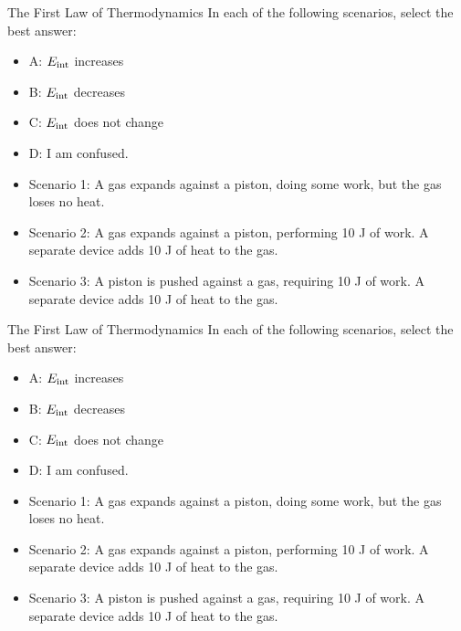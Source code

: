 \documentclass{beamer}
\begin{document}
\begin{frame}{The First Law of Thermodynamics}
In each of the following scenarios, select the best answer:
\small
\begin{itemize}
\item A: $E_{\rm int}$ increases
\item B: $E_{\rm int}$ decreases
\item C: $E_{\rm int}$ does not change
\item D: I am confused.
\end{itemize}
\small
\begin{itemize}
\item Scenario 1: A gas expands against a piston, doing some work, but the gas loses no heat.
\item Scenario 2: \alert{A gas expands against a piston, performing 10 J of work.  A separate device adds 10 J of heat to the gas.}
\item Scenario 3: A piston is pushed against a gas, requiring 10 J of work.  A separate device adds 10 J of heat to the gas.
\end{itemize}
\end{frame}

\begin{frame}{The First Law of Thermodynamics}
In each of the following scenarios, select the best answer:
\small
\begin{itemize}
\item A: $E_{\rm int}$ increases
\item B: $E_{\rm int}$ decreases
\item C: $E_{\rm int}$ does not change
\item D: I am confused.
\end{itemize}
\small
\begin{itemize}
\item Scenario 1: A gas expands against a piston, doing some work, but the gas loses no heat.
\item Scenario 2: A gas expands against a piston, performing 10 J of work.  A separate device adds 10 J of heat to the gas.
\item Scenario 3: \alert{A piston is pushed against a gas, requiring 10 J of work.  A separate device adds 10 J of heat to the gas.}
\end{itemize}
\end{frame}
\end{document}

